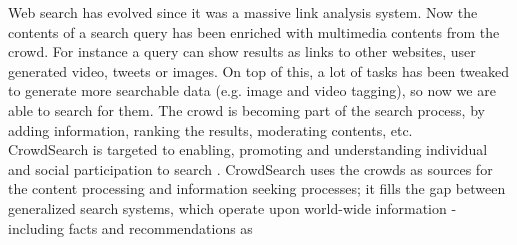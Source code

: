 Web search has evolved since it was a massive link analysis system. Now the
contents of a search query has been enriched with multimedia contents from the
crowd. For instance a query can show results as links to other websites,
user generated video, tweets or images. On top of this, a lot of tasks has been
tweaked to generate more searchable data (e.g. image and video tagging), so now
we are able to search for them. The crowd is becoming part of the search process,
by adding information, ranking the results, moderating contents, etc.\\

CrowdSearch is targeted to enabling, promoting and understanding individual
and social participation to search \cite{fraternali2012crowdsearch}.
CrowdSearch uses the crowds as sources for the content processing and information
seeking processes; it fills the gap between generalized search systems, which
operate upon world-wide information - including facts and recommendations as
